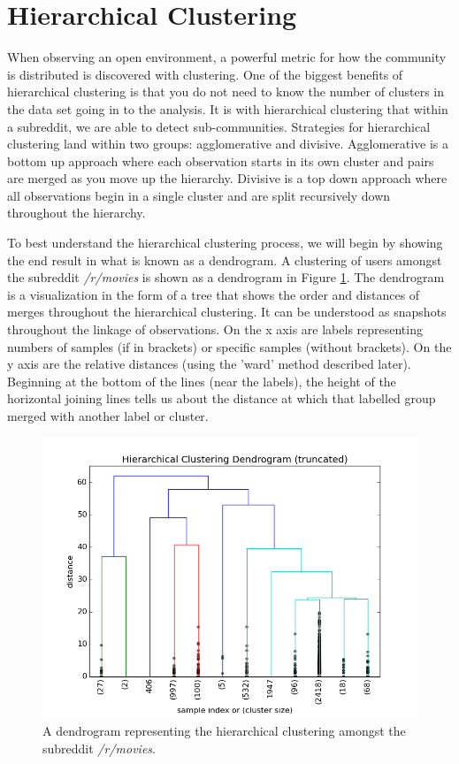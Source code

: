 \documentclass[msc,oneside]{ubcthesis}%
\begin{document}
\section{Hierarchical Clustering}
When observing an open environment, a powerful metric for how the community is distributed is discovered with clustering. One of the biggest benefits of hierarchical clustering is that you do not need to know the number of clusters in the data set going in to the analysis. It is with hierarchical clustering that within a subreddit, we are able to detect sub-communities. Strategies for hierarchical clustering land within two groups: agglomerative and divisive. Agglomerative is a bottom up approach where each observation starts in its own cluster and pairs are merged as you move up the hierarchy. Divisive is a top down approach where all observations begin in a single cluster and are split recursively down throughout the hierarchy. 
\par
To best understand the hierarchical clustering process, we will begin by showing the end result in what is known as a dendrogram. A clustering of users amongst the subreddit \textit{/r/movies} is shown as a dendrogram in Figure \ref{fig:moviesdend}. The dendrogram is a visualization in the form of a tree that shows the order and distances of merges throughout the hierarchical clustering. It can be understood as snapshots throughout the linkage of observations. On the x axis are labels representing numbers of samples (if in brackets) or specific samples (without brackets). On the y axis are the relative distances (using the 'ward' method described later). Beginning at the bottom of the lines (near the labels), the height of the horizontal joining lines tells us about the distance at which that labelled group merged with another label or cluster. 

\begin{figure}[H]
\includegraphics[width=\textwidth]{movies_dendogram.png}
\caption[Dendrogram of /r/movies]{
A dendrogram representing the hierarchical clustering amongst the subreddit \textit{/r/movies}.}
\label{fig:moviesdend}
\end{figure}
\end{document}

